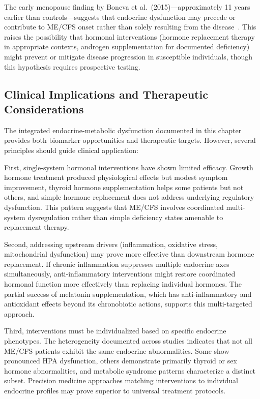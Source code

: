 The early menopause finding by Boneva et al.\ (2015)---approximately 11 years earlier than controls---suggests that endocrine dysfunction may precede or contribute to ME/CFS onset rather than solely resulting from the disease~\cite{boneva2015menopause}. This raises the possibility that hormonal interventions (hormone replacement therapy in appropriate contexts, androgen supplementation for documented deficiency) might prevent or mitigate disease progression in susceptible individuals, though this hypothesis requires prospective testing.

\subsection{Clinical Implications and Therapeutic Considerations}

The integrated endocrine-metabolic dysfunction documented in this chapter provides both biomarker opportunities and therapeutic targets. However, several principles should guide clinical application:

First, single-system hormonal interventions have shown limited efficacy. Growth hormone treatment produced physiological effects but modest symptom improvement, thyroid hormone supplementation helps some patients but not others, and simple hormone replacement does not address underlying regulatory dysfunction. This pattern suggests that ME/CFS involves coordinated multi-system dysregulation rather than simple deficiency states amenable to replacement therapy.

Second, addressing upstream drivers (inflammation, oxidative stress, mitochondrial dysfunction) may prove more effective than downstream hormone replacement. If chronic inflammation suppresses multiple endocrine axes simultaneously, anti-inflammatory interventions might restore coordinated hormonal function more effectively than replacing individual hormones. The partial success of melatonin supplementation, which has anti-inflammatory and antioxidant effects beyond its chronobiotic actions, supports this multi-targeted approach.

Third, interventions must be individualized based on specific endocrine phenotypes. The heterogeneity documented across studies indicates that not all ME/CFS patients exhibit the same endocrine abnormalities. Some show pronounced HPA dysfunction, others demonstrate primarily thyroid or sex hormone abnormalities, and metabolic syndrome patterns characterize a distinct subset. Precision medicine approaches matching interventions to individual endocrine profiles may prove superior to universal treatment protocols.

